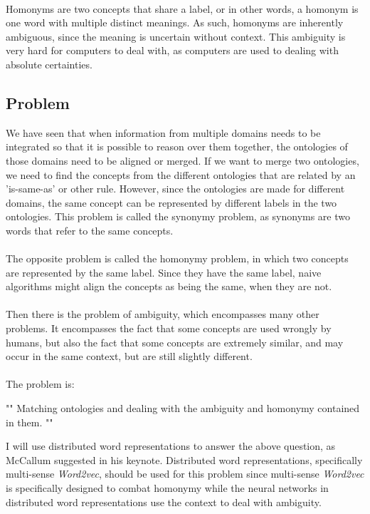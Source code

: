 \documentclass{article}
\begin{document}
 \paragraph{}
 Homonyms are two concepts that share a label, or in other words, a homonym is one word with multiple distinct meanings. As such, homonyms are inherently ambiguous, since the meaning is uncertain without context. This ambiguity is very hard for computers to deal with, as computers are used to dealing with absolute certainties.
  
 \subsection{Problem}
 We have seen that when information from multiple domains needs to be integrated so that it is possible to reason over them together, the ontologies of those domains need to be aligned or merged.
 If we want to merge two ontologies, we need to find the concepts from the different ontologies that are related by an 'is-same-as' or other rule.
 However, since the ontologies are made for different domains, the same concept can be represented by different labels in the two ontologies. This problem is called the synonymy problem, as synonyms are two words that refer to the same concepts.
 \paragraph{}
 The opposite problem is called the homonymy problem, in which two concepts are represented by the same label. Since they have the same label, naive algorithms might align the concepts as being the same, when they are not.
 \paragraph{}
 Then there is the problem of ambiguity, which encompasses many other problems. It encompasses the fact that some concepts are used wrongly by humans, but also the fact that some concepts are extremely similar, and may occur in the same context, but are still slightly different.
 \paragraph{}
 The problem is:
 
"" 
  Matching ontologies and dealing with the ambiguity and homonymy contained in them.
"" %

  I will use distributed word representations to answer the above question, as McCallum suggested in his keynote. Distributed word representations, specifically multi-sense \emph{Word2vec}, should be used for this problem since multi-sense \emph{Word2vec} is specifically designed to combat homonymy while the neural networks in distributed word representations use the context to deal with ambiguity.
  
\end{document}
